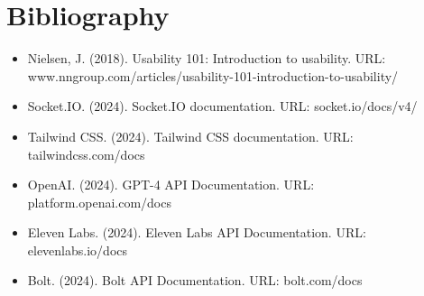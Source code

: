 \chapter*{Bibliography}

\begin{itemize}
  \item Nielsen, J. (2018). Usability 101: Introduction to usability. 
        \newline URL: www.nngroup.com/articles/usability-101-introduction-to-usability/
  \item Socket.IO. (2024). Socket.IO documentation. 
        \newline URL: socket.io/docs/v4/
  \item Tailwind CSS. (2024). Tailwind CSS documentation. 
        \newline URL: tailwindcss.com/docs
  \item OpenAI. (2024). GPT-4 API Documentation. 
        \newline URL: platform.openai.com/docs
  \item Eleven Labs. (2024). Eleven Labs API Documentation. 
        \newline URL: elevenlabs.io/docs
  \item Bolt. (2024). Bolt API Documentation. 
        \newline URL: bolt.com/docs
\end{itemize}
